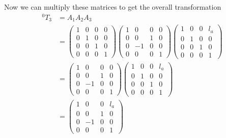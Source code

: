 \documentclass[a4paper,11pt]{article}
\begin{document}
\begin {enumerate}
\begin{enumerate}
        Now we can multiply these matrices to get the overall transformation
        \begin{align*}
          {^0T_3} &= A_1A_2A_3\\
          &= \begin{pmatrix}
            1 & 0 & 0 & 0\\
            0 & 1 & 0 & 0\\
            0 & 0 & 1 & 0\\
            0 & 0 & 0 & 1
          \end{pmatrix} \begin{pmatrix}
            1 & 0 & 0 & 0\\
            0 & 0 & 1 & 0\\
            0 & -1 & 0 & 0\\
            0 & 0 & 0 & 1
          \end{pmatrix} \begin{pmatrix}
            1 & 0 & 0 & l_a\\
            0 & 1 & 0 & 0\\
            0 & 0 & 1 & 0\\
            0 & 0 & 0 & 1
          \end{pmatrix}\\
          &= \begin{pmatrix}
            1 & 0 & 0 & 0\\
            0 & 0 & 1 & 0\\
            0 & -1 & 0 & 0\\
            0 & 0 & 0 & 1
          \end{pmatrix} \begin{pmatrix}
            1 & 0 & 0 & l_a\\
            0 & 1 & 0 & 0\\
            0 & 0 & 1 & 0\\
            0 & 0 & 0 & 1
          \end{pmatrix}\\
          &=  \begin{pmatrix}
            1 & 0 & 0 & l_a\\
            0 & 0 & 1 & 0\\
            0 & -1 & 0 & 0\\
            0 & 0 & 0 & 1
          \end{pmatrix}\\
        \end{align*}


    \end{enumerate}


\end{enumerate}
\end{document}

